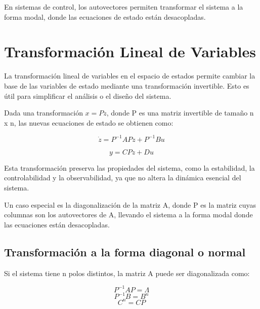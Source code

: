 \documentclass[legalpaper,twocolumn]{article}
\begin{document}
En sistemas de control, los autovectores permiten transformar el sistema a la forma modal, donde las ecuaciones de estado están desacopladas.

\section*{Transformación Lineal de Variables}

La transformación lineal de variables en el espacio de estados permite cambiar la base de las variables de estado mediante una transformación invertible. Esto es útil para simplificar el análisis o el diseño del sistema.

Dada una transformación \( x = P z \), donde P es una matriz invertible de tamaño n x n, las nuevas ecuaciones de estado se obtienen como:

\[ \dot{z} = P^{-1} A P z + P^{-1} B u \]

\[ y = C P z + D u \]

Esta transformación preserva las propiedades del sistema, como la estabilidad, la controlabilidad y la observabilidad, ya que no altera la dinámica esencial del sistema.

Un caso especial es la diagonalización de la matriz A, donde P es la matriz cuyas columnas son los autovectores de A, llevando el sistema a la forma modal donde las ecuaciones están desacopladas.

\subsection{Transformación a la forma diagonal o normal}

Si el sistema tiene n polos distintos, la matriz A puede ser diagonalizada como:


\[P^{-1}AP = \Lambda\]
\[P^{-1}B=B^n\]
\[C^n=CP\]
\end{document}
